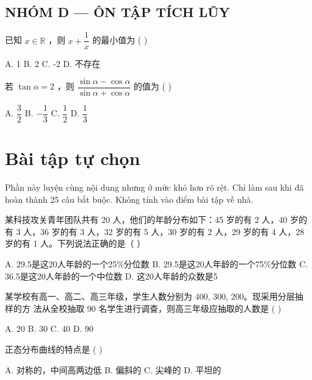 \documentclass[11pt, a4paper]{article}
\begin{document}
\subsection*{NHÓM D — ÔN TẬP TÍCH LŨY}

\begin{baitap}[24]
已知 $x \in \mathbb{R}$ ，则 $x + \dfrac{1}{x}$ 的最小值为 ( )
\par\vspace{3pt}
\noindent A. 1 \quad B. 2 \quad C. -2 \quad D. 不存在
\end{baitap}

\begin{baitap}[25]
若 $\tan\alpha = 2$ ，则 $\dfrac{\sin\alpha - \cos\alpha}{\sin\alpha + \cos\alpha}$ 的值为 ( )
\par\vspace{3pt}
\noindent A. $\dfrac{3}{2}$ \quad B. $-\dfrac{1}{3}$ \quad C. $\dfrac{1}{2}$ \quad D. $\dfrac{1}{3}$
\end{baitap}

\clearpage
\section{Bài tập tự chọn}

Phần này luyện cùng nội dung nhưng ở mức khó hơn rõ rệt. Chỉ làm sau khi đã hoàn thành 25 câu bắt buộc. Không tính vào điểm bài tập về nhà.

\begin{baitap}[1]
某科技攻关青年团队共有 20 人，他们的年龄分布如下：45 岁的有 2 人，40 岁的有 3 人，36 岁的有 3 人，32 岁的有 5 人，30 岁的有 2 人，29 岁的有 4 人，28 岁的有 1 人。下列说法正确的是（ ）
\par\vspace{3pt}
\noindent A. 29.5是这20人年龄的一个25\%分位数 \quad B. 29.5是这20人年龄的一个75\%分位数 \quad C. 36.5是这20人年龄的一个中位数 \quad D. 这20人年龄的众数是5
\end{baitap}

\begin{baitap}[2]
某学校有高一、高二、高三年级，学生人数分别为 400, 300, 200。现采用分层抽样的方 法从全校抽取 90 名学生进行调查，则高三年级应抽取的人数是 ( )
\par\vspace{3pt}
\noindent A. 20 \quad B. 30 \quad C. 40 \quad D. 90
\end{baitap}

\begin{baitap}[3]
正态分布曲线的特点是 ( )
\par\vspace{3pt}
\noindent A. 对称的，中间高两边低 \quad B. 偏斜的 \quad C. 尖峰的 \quad D. 平坦的
\end{baitap}
\end{document}
